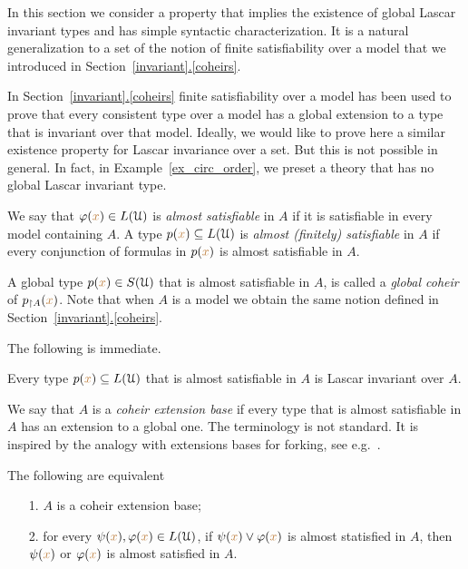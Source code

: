 \documentclass[creche.tex]{subfiles}
\begin{document}
In this section we consider a property that implies the existence of global Lascar invariant types and has simple syntactic characterization.
It is a natural generalization to a set of the notion of finite satisfiability over a model that we introduced in Section~\hyperref[coheirs]{\ref*{invariant}.\ref*{coheirs}}.

In Section~\hyperref[coheirs]{\ref*{invariant}.\ref*{coheirs}} finite satisfiability over a model has been used to prove that every consistent type over a model has a global extension to a type that is invariant over that model. 
Ideally, we would like to prove here a similar existence property for Lascar invariance over a set.
But this is not possible in general.
In fact, in Example~\ref{ex_circ_order}, we preset a theory that has no global Lascar invariant type.

We say that $\varphi({\color{brown} x})\in L(\EuScript U)$ is \emph{almost satisfiable\/} in $A$ if it is satisfiable in every model containing $A$.
A type $p({\color{brown} x})\subseteq L(\EuScript U)$ is \emph{almost (finitely) satisfiable\/} in $A$ if every conjunction of formulas in $p({\color{brown} x})$ is almost satisfiable in $A$. 

A global type $p({\color{brown} x})\in S(\EuScript U)$ that is almost satisfiable in $A$, is called a \emph{global coheir\/} of $p_{\restriction A}({\color{brown} x})$. 
Note that when $A$ is a model we obtain the same notion defined in Section~\hyperref[coheirs]{\ref*{invariant}.\ref*{coheirs}}.

The following is immediate.

\begin{proposition}
Every type $p({\color{brown} x})\subseteq L(\EuScript U)$ that is almost satisfiable in $A$ is Lascar invariant over $A$.\QED
\end{proposition}

\noindent\llap{\textcolor{red}{\Large\danger}\kern1.5ex}We say that $A$ is a \emph{coheir extension base\/} if every type that is almost satisfiable in $A$ has an extension to a global one.
The terminology is not standard.
It is inspired by the analogy with extensions bases for forking, see e.g.~\cite{Simon}.  

\begin{proposition}\label{prop_exisntence_coheirs_over_sets}
  The following are equivalent
  \begin{itemize}
    \item[1.] $A$ is a coheir extension base;
    \item[2.] for every $\psi({\color{brown} x}),\varphi({\color{brown} x})\in L(\EuScript U)$, if $\psi({\color{brown} x})\vee\varphi({\color{brown} x})$ is almost statisfied in $A$, then $\psi({\color{brown} x})$ or $\varphi({\color{brown} x})$ is almost satisfied in $A$. 
  \end{itemize}  
\end{proposition}
  
\end{document}

